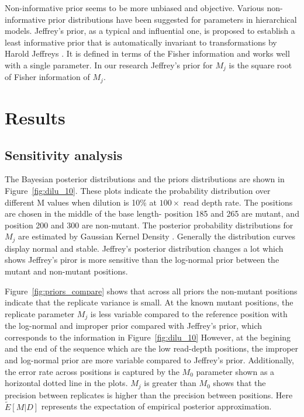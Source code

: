 \documentclass[11pt,reqno]{amsart}
\begin{document}
Non-informative prior seems to be more unbiased and objective.
Various non-informative prior distributions have been suggested for parameters in hierarchical models.
Jeffrey's prior, as a typical and influential one, is proposed to establish a least informative prior that is automatically invariant to transformations by Harold Jeffreys \citep{jeffreys1946invariant}.
It is defined in terms of the Fisher information and works well with a single parameter. In our research Jeffrey's prior for $M_j$ is the square root of Fisher information of $M_j$.

\section{Results}

\subsection{Sensitivity analysis}

The Bayesian posterior distributions and the priors distributions are shown in Figure~\ref{fig:dilu_10}.
These plots indicate the probability distribution over different M values when dilution is 10\% at $100\times$ read depth rate.
The positions are chosen in the middle of the base length- position 185 and 265 are mutant, and position 200 and 300 are non-mutant.
The posterior probability distributions for $M_j$ are estimated by Gaussian Kernel Density \citep{silverman1986density}.
Generally the distribution curves display normal and stable.
Jeffrey's posterior distribution changes a lot which shows Jeffrey's piror is more sensitive than the log-normal prior between the mutant and non-mutant positions.

Figure~\ref{fig:priors_compare} shows that across all priors the non-mutant positions indicate that the replicate variance is small. 
At the known mutant positions, the replicate parameter $M_j$ is less variable compared to the reference position with the log-normal and improper prior compared with Jeffrey's prior, which corresponds to the information in Figure~\ref{fig:dilu_10}
However, at the begining and the end of the sequence which are the low read-depth positions, the improper and log-normal prior are more variable compared to Jeffrey's prior.
Additionally, the error rate across positions is captured by the $M_0$ parameter shown as a horizontal dotted line in the plots. 
$M_j$ is greater than $M_0$ shows that the precision between replicates is higher than the precision between positions. 
Here $\widetilde{E}[M|D]$ represents the expectation of empirical posterior approximation.
\end{document}
